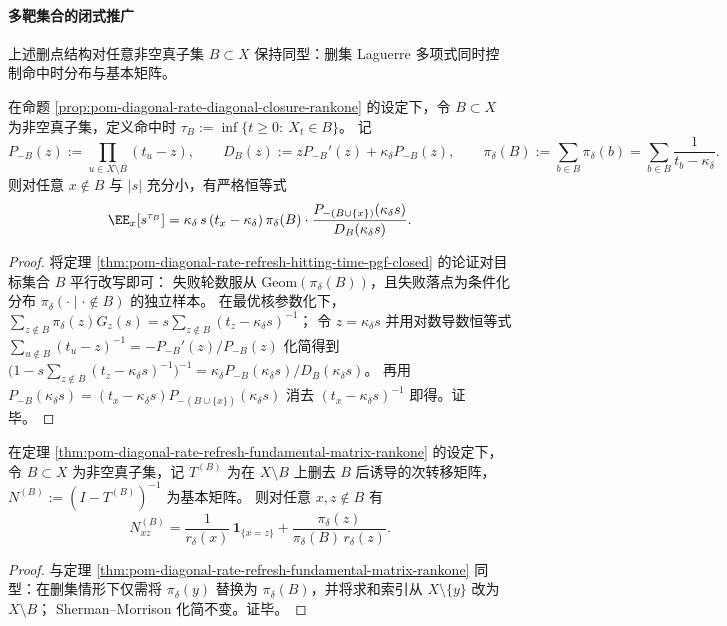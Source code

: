\paragraph{多靶集合的闭式推广}
上述删点结构对任意非空真子集 \(B\subset X\) 保持同型：删集 Laguerre 多项式同时控制命中时分布与基本矩阵。

\begin{theorem}\label{thm:pom-diagonal-rate-refresh-hitting-time-deleted-set-laguerre-pgf}
在命题 \ref{prop:pom-diagonal-rate-diagonal-closure-rankone} 的设定下，令 \(B\subset X\) 为非空真子集，定义命中时
\(
\tau_B:=\inf\{t\ge 0:\ X_t\in B\}
\)。
记
\[
P_{-B}(z):=\prod_{u\in X\setminus B}(t_u-z),\qquad
D_B(z):=zP_{-B}'(z)+\kappa_\delta P_{-B}(z),
\qquad
\pi_\delta(B):=\sum_{b\in B}\pi_\delta(b)=\sum_{b\in B}\frac{1}{t_b-\kappa_\delta}.
\]
则对任意 \(x\notin B\) 与 \(|s|\) 充分小，有严格恒等式
\[
\EE_x[s^{\tau_B}]
=
\kappa_\delta\,s\,(t_x-\kappa_\delta)\,\pi_\delta(B)\cdot
\frac{P_{-(B\cup\{x\})}(\kappa_\delta s)}{D_B(\kappa_\delta s)}.
\]
\end{theorem}
\begin{proof}
将定理 \ref{thm:pom-diagonal-rate-refresh-hitting-time-pgf-closed} 的论证对目标集合 \(B\) 平行改写即可：
失败轮数服从 \(\mathrm{Geom}(\pi_\delta(B))\)，且失败落点为条件化分布 \(\pi_\delta(\cdot\mid \cdot\notin B)\) 的独立样本。
在最优核参数化下，
\(
\sum_{z\notin B}\pi_\delta(z)G_z(s)=s\sum_{z\notin B}(t_z-\kappa_\delta s)^{-1}
\)；
令 \(z=\kappa_\delta s\) 并用对数导数恒等式
\(
\sum_{u\notin B}(t_u-z)^{-1}=-P_{-B}'(z)/P_{-B}(z)
\)
化简得到
\(
\bigl(1-s\sum_{z\notin B}(t_z-\kappa_\delta s)^{-1}\bigr)^{-1}=\kappa_\delta P_{-B}(\kappa_\delta s)/D_B(\kappa_\delta s)
\)。
再用 \(P_{-B}(\kappa_\delta s)=(t_x-\kappa_\delta s)P_{-(B\cup\{x\})}(\kappa_\delta s)\) 消去 \((t_x-\kappa_\delta s)^{-1}\) 即得。证毕。
\end{proof}

\begin{proposition}[删集基本矩阵的秩一闭式]\label{prop:pom-diagonal-rate-refresh-fundamental-matrix-rankone-set}
在定理 \ref{thm:pom-diagonal-rate-refresh-fundamental-matrix-rankone} 的设定下，令 \(B\subset X\) 为非空真子集，记 \(T^{(B)}\) 为在 \(X\setminus B\) 上删去 \(B\) 后诱导的次转移矩阵，\(N^{(B)}:=(I-T^{(B)})^{-1}\) 为基本矩阵。
则对任意 \(x,z\notin B\) 有
\[
N^{(B)}_{xz}=\frac{1}{r_\delta(x)}\,\mathbf 1_{\{x=z\}}+\frac{\pi_\delta(z)}{\pi_\delta(B)\,r_\delta(z)}.
\]
\end{proposition}
\begin{proof}
与定理 \ref{thm:pom-diagonal-rate-refresh-fundamental-matrix-rankone} 同型：在删集情形下仅需将 \(\pi_\delta(y)\) 替换为 \(\pi_\delta(B)\)，并将求和索引从 \(X\setminus\{y\}\) 改为 \(X\setminus B\)；
Sherman--Morrison 化简不变。证毕。
\end{proof}

